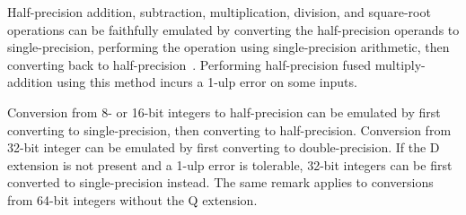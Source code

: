 \begin{commentary}
Half-precision addition, subtraction, multiplication, division, and
square-root operations can be faithfully emulated by converting the
half-precision operands to single-precision, performing the operation
using single-precision arithmetic, then converting back to
half-precision~\cite{roux:hal-01091186}.
Performing half-precision fused multiply-addition using this method incurs
a 1-ulp error on some inputs.

Conversion from 8- or 16-bit integers to half-precision can be emulated by
first converting to single-precision, then converting to half-precision.
Conversion from 32-bit integer can be emulated by first converting to
double-precision.
If the D extension is not present and a 1-ulp error is tolerable, 32-bit
integers can be first converted to single-precision instead.
The same remark applies to conversions from 64-bit integers without the Q
extension.
\end{commentary}
